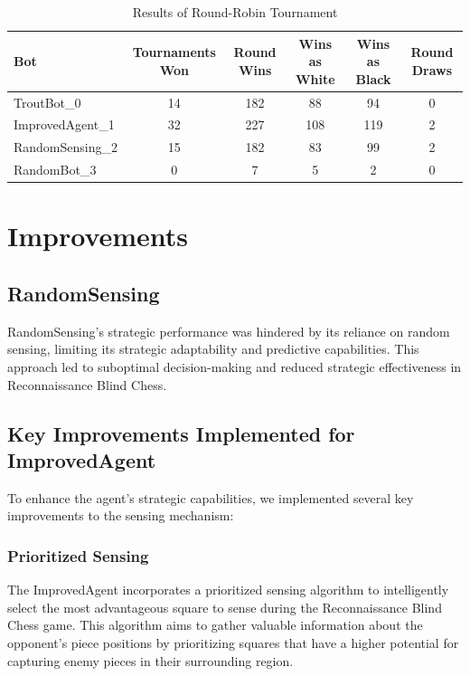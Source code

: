 \documentclass[10pt]{article}
\begin{document}
\begin{table}[H]
\centering
\caption{Results of Round-Robin Tournament}
\label{tab:results}
\begin{tabular}{|l|c|c|c|c|c|}
\hline
\textbf{Bot} & \textbf{Tournaments Won} & \textbf{Round Wins} & \textbf{Wins as White} & \textbf{Wins as Black} & \textbf{Round Draws} \\ \hline
TroutBot\_0 & 14 & 182 & 88 & 94 & 0 \\ \hline
ImprovedAgent\_1 & 32 & 227 & 108 & 119 & 2 \\ \hline
RandomSensing\_2 & 15 & 182 & 83 & 99 & 2 \\ \hline
RandomBot\_3 & 0 & 7 & 5 & 2 & 0 \\ \hline
\end{tabular}
\end{table}

\section{Improvements}

\subsection{RandomSensing}

RandomSensing's strategic performance was hindered by its reliance on random sensing, limiting its strategic adaptability and predictive capabilities. This approach led to suboptimal decision-making and reduced strategic effectiveness in Reconnaissance Blind Chess.

\subsection{Key Improvements Implemented for ImprovedAgent}

To enhance the agent's strategic capabilities, we implemented several key improvements to the sensing mechanism:

\subsubsection{Prioritized Sensing}

The ImprovedAgent incorporates a prioritized sensing algorithm to intelligently select the most advantageous square to sense during the Reconnaissance Blind Chess game. This algorithm aims to gather valuable information about the opponent's piece positions by prioritizing squares that have a higher potential for capturing enemy pieces in their surrounding region.
\end{document}
